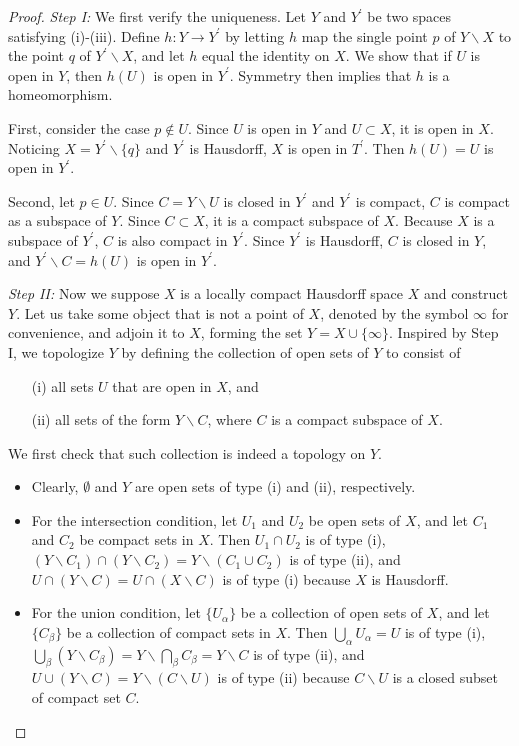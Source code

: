 \documentclass{article}
\numberwithin{equation}{section}
\theoremstyle{plain}
\theoremstyle{definition}
\begin{document}
\begin{proof}
\textit{Step I:} We first verify the uniqueness. Let $Y$ and $Y^\prime$ be two spaces satisfying (i)-(iii). Define $h:Y\to Y^\prime$ by letting $h$ map the single point $p$ of $Y\backslash X$ to the point $q$ of $Y^\prime\backslash X$, and let $h$ equal the identity on $X$. We show that if $U$ is open in $Y$, then $h(U)$ is open in $Y^\prime$. Symmetry then implies that $h$ is a homeomorphism.

First, consider the case $p\notin U$. Since $U$ is open in $Y$ and $U\subset X$, it is open in $X$. Noticing $X=Y^\prime\backslash\{q\}$ and $Y^\prime$ is Hausdorff, $X$ is open in $T^\prime$. Then $h(U)=U$ is open in $Y^\prime$.

Second, let $p\in U$. Since $C=Y\backslash U$ is closed in $Y^\prime$ and $Y^\prime$ is compact, $C$ is compact as a subspace of $Y$. Since $C\subset X$, it is a compact subspace of $X$. Because $X$ is a subspace of $Y^\prime$, $C$ is also compact in $Y^\prime$. Since $Y^\prime$ is Hausdorff, $C$ is closed in $Y$, and $Y^\prime\backslash C = h(U)$ is open in $Y^\prime$.
\vspace{0.2cm}

\textit{Step II:} Now we suppose $X$ is a locally compact Hausdorff space $X$ and construct $Y$. Let us take some object that is not a point
of $X$, denoted by the symbol $\infty$ for convenience, and adjoin it to $X$, forming the set $Y=X\cup\{\infty\}$. Inspired by Step I, we topologize $Y$ by defining the collection of open sets of $Y$ to consist of 
\begin{itemize}
	\item[(i)] all sets $U$ that are open in $X$, and
	\item[(ii)] all sets of the form $Y\backslash C$, where $C$ is a compact subspace of $X$.
\end{itemize}

We first check that such collection is indeed a topology on $Y$. 
\begin{itemize}
	\item Clearly, $\emptyset$ and $Y$ are open sets of type (i) and (ii), respectively.
	\item For the intersection condition, let $U_1$ and $U_2$ be open sets of $X$, and let $C_1$ and $C_2$ be compact sets in $X$. Then $U_1\cap U_2$ is of type (i), $(Y\backslash C_1)\cap (Y\backslash C_2) = Y\backslash(C_1\cup C_2)$ is of type (ii), and $U\cap (Y\backslash C) = U\cap(X\backslash C)$ is of type (i) because $X$ is Hausdorff.
	\item For the union condition, let $\{U_\alpha\}$ be a collection of open sets of $X$, and let $\{C_\beta\}$ be a collection of compact sets in $X$. Then $\bigcup_{\alpha}U_\alpha = U$ is of type (i), $\bigcup_{\beta}(Y\backslash C_\beta) = Y\backslash\bigcap_\beta C_\beta = Y\backslash C$ is of type (ii), and $U \cup (Y\backslash C) = Y\backslash (C\backslash U)$ is of type (ii) because $C\backslash U$ is a closed subset of compact set $C$.
\end{itemize} 


\end{proof}
\end{document}
